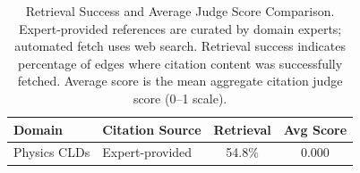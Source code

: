\begin{table}[H]
\centering
\small
\caption{Retrieval Success and Average Judge Score Comparison. Expert-provided references are curated by domain experts; automated fetch uses web search. Retrieval success indicates percentage of edges where citation content was successfully fetched. Average score is the mean aggregate citation judge score (0--1 scale).}
\label{tab:retrieval-comparison}
\begin{tabular}{llcc}
\toprule
\textbf{Domain} & \textbf{Citation Source} & \textbf{Retrieval} & \textbf{Avg Score} \\
\midrule
Physics CLDs & Expert-provided & 54.8\% & 0.000 \\
\bottomrule
\end{tabular}
\end{table}
